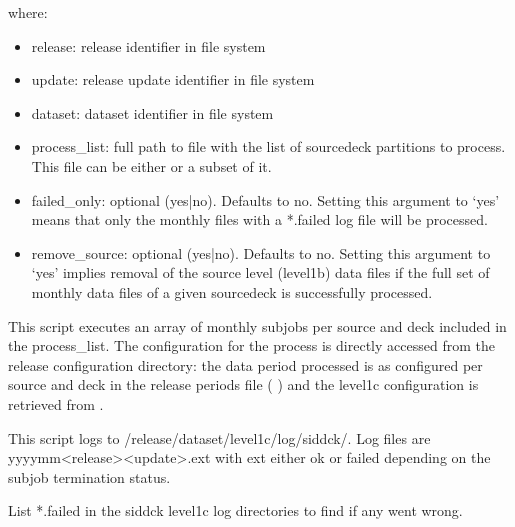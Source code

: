 \documentclass[letterpaper,10pt,english]{sphinxmanual}
\begin{document}
where:
\begin{itemize}
\item {} 
release: release identifier in file system

\item {} 
update: release update identifier in file system

\item {} 
dataset: dataset identifier in file system

\item {} 
process\_list: full path to file with the list of source\sphinxhyphen{}deck partitions to
process. This file can be either {\hyperref[\detokenize{index:process-list-file}]{}} or a subset of it.

\item {} 
failed\_only: optional (yes|no). Defaults to no. Setting this argument to ‘yes’
means that only the monthly files with a *.failed log file will be processed.

\item {} 
remove\_source: optional (yes|no). Defaults to no. Setting this argument to ‘yes’
implies removal of the source level (level1b) data files if the full set of
monthly data files of a given source\sphinxhyphen{}deck is successfully processed.

\end{itemize}

This script executes an array of monthly subjobs per source and deck included in
the process\_list. The configuration for the process is directly accessed from
the release configuration directory: the data period processed is as configured
per source and deck in the release periods file ( {\hyperref[\detokenize{index:release-periods-file}]{}})
and the level1c configuration is retrieved from {\hyperref[\detokenize{index:level1c-config-file}]{}}.

This script logs to /release/dataset/level1c/log/sid\sphinxhyphen{}dck/. Log files
are yyyy\sphinxhyphen{}mm\sphinxhyphen{}\textless{}release\textgreater{}\sphinxhyphen{}\textless{}update\textgreater{}.ext with ext either ok or failed depending on the
subjob termination status.

List  *.failed in the sid\sphinxhyphen{}dck level1c log directories to find if any went wrong.
\end{document}
